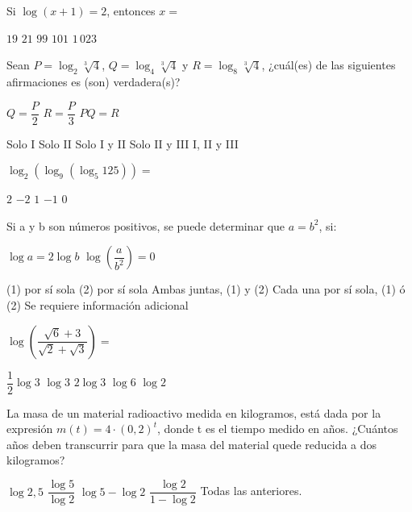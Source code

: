 \documentclass[sin fecha]{srs}
\begin{document}
\begin{preguntas}[after-item-skip=1cm]
\pregunta Si $\log \left(x + 1\right) = 2$, entonces $x =$
\begin{vertical}
\alternativa $19$
\alternativa $21$
\alternativa $99$
\alternativa $101$
\alternativa $1\,023$
\end{vertical}

\pregunta Sean $P = \log_2 \sqrt[3]{4}$, $Q = \log_4 \sqrt[3]{4}$ y $R = \log_8 \sqrt[3]{4}$, ¿cuál(es) de las siguientes afirmaciones es (son) verdadera(s)?
\begin{verticali}
\alternativa $Q = \dfrac{P}{2}$
\alternativa $R = \dfrac{P}{3}$
\alternativa $PQ = R$
\end{verticali}
\begin{vertical}
\alternativa Solo I
\alternativa Solo II
\alternativa Solo I y II
\alternativa Solo II y III
\alternativa I, II y III
\end{vertical}

\pregunta $\log_2 \left(\log_9 \left(\log_5 125\right)\right) =$
\begin{vertical}
\alternativa $2$
\alternativa $-2$
\alternativa $1$
\alternativa $-1$
\alternativa $0$
\end{vertical}

\pregunta Si a y b son números positivos, se puede determinar que $a = b^2$, si:
\begin{verticaln}
\alternativa $\log a = 2 \log b$
\alternativa $\log \left(\dfrac{a}{b^2}\right) = 0$
\end{verticaln}
\begin{vertical}
\alternativa (1) por sí sola
\alternativa (2) por sí sola
\alternativa Ambas juntas, (1) y (2)
\alternativa Cada una por sí sola, (1) ó (2)
\alternativa Se requiere información adicional
\end{vertical}

\pregunta $\log \left(\dfrac{\sqrt{6} + 3}{\sqrt{2} + \sqrt{3}}\right) =$
\begin{vertical}
\alternativa $\dfrac{1}{2} \log 3$
\alternativa $\log 3$
\alternativa $2 \log 3$
\alternativa $\log 6$
\alternativa $\log 2$
\end{vertical}

\pregunta La masa de un material radioactivo medida en kilogramos, está dada por la expresión $m\left(t\right) = 4 \cdot \left(0,2\right)^t$, donde t es el tiempo medido en años. ¿Cuántos años deben transcurrir para que la masa del material quede reducida a dos kilogramos?
\begin{vertical}
\alternativa $\log 2,5$
\alternativa $\dfrac{\log 5}{\log 2}$
\alternativa $\log 5 - \log 2$
\alternativa $\dfrac{\log 2}{1 - \log 2}$
\alternativa Todas las anteriores.
\end{vertical}

\end{preguntas}
\end{document}
